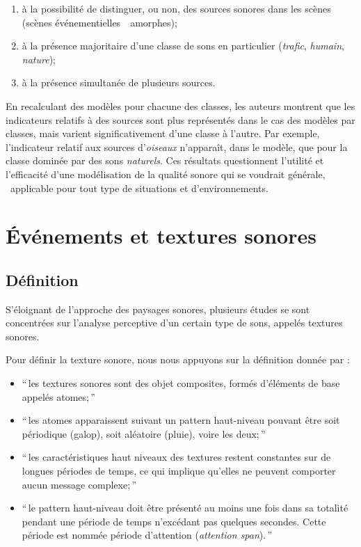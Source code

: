 {{\begin{enumerate}
\item à la possibilité de distinguer, ou non, des sources sonores dans les scènes (scènes événementielles~\vs~amorphes);
\item à la présence majoritaire d'une classe de sons en particulier (\emph{trafic}, \emph{humain}, \emph{nature});
\item à la présence simultanée de plusieurs sources.
\end{enumerate}

En recalculant des modèles pour chacune des classes, les auteurs montrent que les indicateurs relatifs à des sources sont plus représentés dans le cas des modèles par classes, mais varient significativement d'une classe à l'autre. Par exemple, l’indicateur relatif aux sources d'\emph{oiseaux} n'apparaît, dans le modèle, que pour la classe dominée par des sons \emph{naturels}. Ces résultats questionnent l'utilité et l'efficacité d'une modélisation de la qualité sonore qui se voudrait générale, \ie~applicable pour tout type de situations et d'environnements.


\section{Événements et textures sonores}
\label{sec:ch3_eventTexture}

\subsection{Définition}
\label{sec:ch3_textureDef}

S'éloignant de l'approche des paysages sonores, plusieurs études se sont concentrées sur l'analyse perceptive d'un certain type de sons, appelés textures sonores.

Pour définir la texture sonore, nous nous appuyons sur la définition donnée par \citep[p. 25]{saint1995classification}:  

\begin{itemize}
\item ``\,les textures sonores sont des objet composites, formés d'éléments de base appelés atomes;\,''
\item ``\,les atomes apparaissent suivant un pattern haut-niveau pouvant être soit périodique (galop), soit aléatoire (pluie), voire les deux;\,''
\item ``\,les caractéristiques haut niveaux des textures restent constantes sur de longues périodes de temps, ce qui implique qu'elles ne peuvent comporter aucun message complexe;\,''
\item ``\,le pattern haut-niveau doit être présenté au moins une fois dans sa totalité pendant une période de temps n’excédant pas quelques secondes. Cette période est nommée période d'attention (\emph{attention span}).\,''
\end{itemize}

}}
